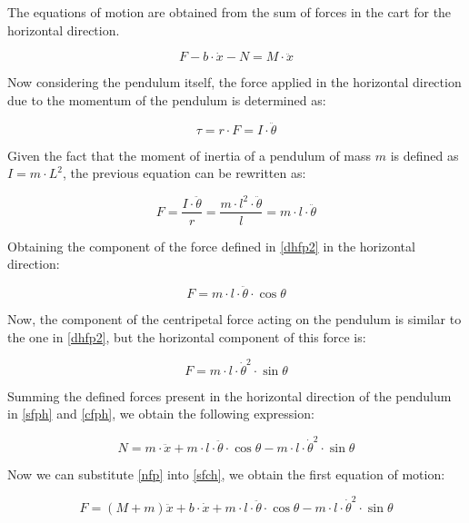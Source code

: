 \documentclass{article}
\begin{document}
The equations of motion are obtained from the sum of forces in the cart for the horizontal direction.

\begin{equation} \label{sfch}
	F-b\cdot \dot{x}-N=M\cdot \ddot{x}
\end{equation}

Now considering the pendulum itself, the force applied in the horizontal direction due to the momentum of the pendulum is determined as:

\begin{equation} \label{dhfp}
	\tau=r\cdot F=I\cdot \ddot{\theta}
\end{equation}

Given the fact that the moment of inertia of a pendulum of mass $m$ is defined as $I=m\cdot L^2$, the previous equation can be rewritten as:

\begin{equation} \label{dhfp2}
	F=\frac{I\cdot \ddot{\theta}}{r}=\frac{m\cdot l^2\cdot \ddot{\theta}}{l}=m\cdot l\cdot \ddot{\theta}
\end{equation}

Obtaining the component of the force defined in \ref{dhfp2} in the horizontal direction:

\begin{equation} \label{sfph}
	F=m\cdot l\cdot \ddot{\theta}\cdot \cos{\theta}
\end{equation}

Now, the component of the centripetal force acting on the pendulum is similar to the one in \ref{dhfp2}, but the horizontal component of this force is:

\begin{equation} \label{cfph}
	F=m\cdot l\cdot \dot{\theta}^2\cdot \sin{\theta}
\end{equation}

Summing the defined forces present in the horizontal direction of the pendulum in \ref{sfph} and \ref{cfph}, we obtain the following expression:

\begin{equation} \label{nfp}
	N=m\cdot \ddot{x}+m\cdot l\cdot \ddot{\theta}\cdot \cos{\theta}-m\cdot l\cdot \dot{\theta}^2\cdot \sin{\theta}
\end{equation}

Now we can substitute \ref{nfp} into \ref{sfch}, we obtain the first equation of motion:

\begin{equation} \label{fem}
	F=(M+m)\ddot{x}+b\cdot \dot{x}+m\cdot l\cdot \ddot{\theta}\cdot \cos{\theta}-m\cdot l\cdot \dot{\theta}^2\cdot \sin{\theta}
\end{equation}
\end{document}
